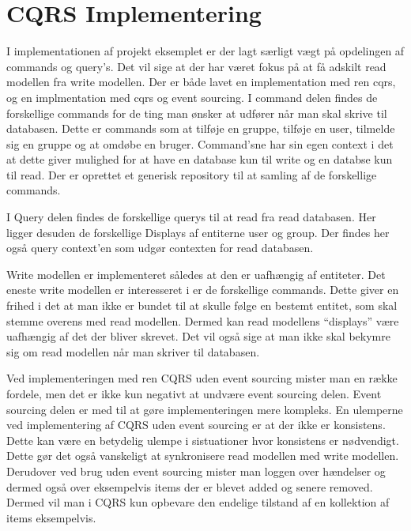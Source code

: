 \chapter{CQRS Implementering}
I implementationen af projekt eksemplet er der lagt særligt vægt på opdelingen af commands og query’s. Det vil sige at der har været fokus på at få adskilt read modellen fra write modellen.
Der er både lavet en implementation med ren cqrs, og en implmentation med cqrs og event sourcing. 
I command delen findes de forskellige commands for de ting man ønsker at udfører når man skal skrive til databasen. Dette er commands som at tilføje en gruppe, tilføje en user, tilmelde sig en gruppe og at omdøbe en bruger. Command’sne har sin egen context i det at dette giver mulighed for at have en database kun til write og en databse kun til read. Der er oprettet et generisk repository til at samling af de forskellige commands. 

I Query delen findes de forskellige querys til at read fra read databasen. Her ligger desuden de forskellige Displays af entiterne user og group. Der findes her også query context’en som udgør contexten for read databasen.\newline

Write modellen er implementeret således at den er uafhængig af entiteter. Det eneste write modellen er interesseret i er de forskellige commands. Dette giver en frihed i det at man ikke er bundet til at skulle følge en bestemt entitet, som skal stemme overens med read modellen. Dermed kan read modellens ``displays'' være uafhængig af det der bliver skrevet. Det vil også sige at man ikke skal bekymre sig om read modellen når man skriver til databasen.\newline 

Ved implementeringen med ren CQRS uden event sourcing mister man en række fordele, men det er ikke kun negativt at undvære event sourcing delen. Event sourcing delen er med til at gøre implementeringen mere kompleks. En ulemperne ved implementering af CQRS uden event sourcing er at der ikke er konsistens. Dette kan være en betydelig ulempe i sistuationer hvor konsistens er nødvendigt. Dette gør det også vanskeligt at synkronisere read modellen med write modellen. Derudover ved brug uden event sourcing mister man loggen over hændelser og dermed også over eksempelvis items der er blevet added og senere removed. Dermed vil man i CQRS kun opbevare den endelige tilstand af en kollektion af items eksempelvis. 

